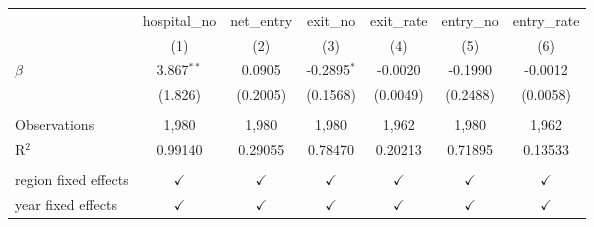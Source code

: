 \begingroup
\centering
\begin{tabular}{lcccccc}
   \toprule
                        & hospital\_no  & net\_entry    & exit\_no      & exit\_rate    & entry\_no     & entry\_rate\\   
                        & (1)           & (2)           & (3)           & (4)           & (5)           & (6)\\  
   \midrule 
   $\beta$              & 3.867$^{**}$  & 0.0905        & -0.2895$^{*}$ & -0.0020       & -0.1990       & -0.0012\\   
                        & (1.826)       & (0.2005)      & (0.1568)      & (0.0049)      & (0.2488)      & (0.0058)\\   
    \\
   Observations         & 1,980         & 1,980         & 1,980         & 1,962         & 1,980         & 1,962\\  
   R$^2$                & 0.99140       & 0.29055       & 0.78470       & 0.20213       & 0.71895       & 0.13533\\  
    \\
   region fixed effects & $\checkmark$  & $\checkmark$  & $\checkmark$  & $\checkmark$  & $\checkmark$  & $\checkmark$\\   
   year fixed effects   & $\checkmark$  & $\checkmark$  & $\checkmark$  & $\checkmark$  & $\checkmark$  & $\checkmark$\\   
   \bottomrule
\end{tabular}
\par\endgroup
